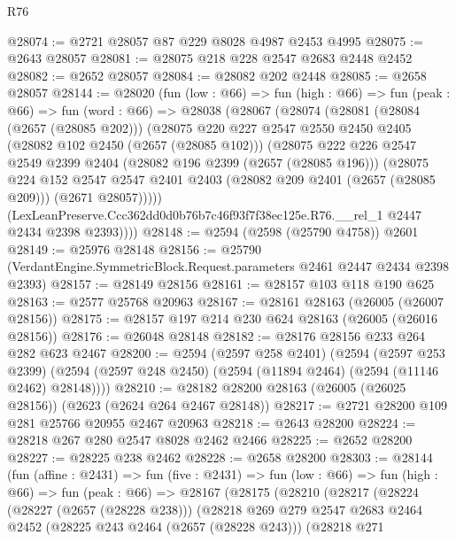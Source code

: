 \begin{lexlean}{R76}
\begin{coremodule}
@28074 := @2721 @28057 @87 @229 @8028 @4987 @2453 @4995
@28075 := @2643 @28057
@28081 := @28075 @218 @228 @2547 @2683 @2448 @2452
@28082 := @2652 @28057
@28084 := @28082 @202 @2448
@28085 := @2658 @28057
@28144 := @28020
    (fun (low : @66) =>
    fun (high : @66) =>
    fun (peak : @66) =>
    fun (word : @66) =>
    @28038
      (@28067
        (@28074
          (@28081
            (@28084 (@2657 (@28085 @202)))
            (@28075
              @220
              @227
              @2547
              @2550
              @2450
              @2405
              (@28082 @102 @2450 (@2657 (@28085 @102)))
              (@28075
                @222
                @226
                @2547
                @2549
                @2399
                @2404
                (@28082 @196 @2399 (@2657 (@28085 @196)))
                (@28075
                  @224
                  @152
                  @2547
                  @2547
                  @2401
                  @2403
                  (@28082 @209 @2401 (@2657 (@28085 @209)))
                  (@2671 @28057)))))
          (LexLeanPreserve.Ccc362dd0d0b76b7c46f93f7f38ec125e.R76.__rel_1 @2447 @2434 @2398 @2393))))
@28148 := @2594 (@2598 (@25790 @4758)) @2601
@28149 := @25976 @28148
@28156 := @25790 (VerdantEngine.SymmetricBlock.Request.parameters @2461 @2447 @2434 @2398 @2393)
@28157 := @28149 @28156
@28161 := @28157 @103 @118 @190 @625
@28163 := @2577 @25768 @20963
@28167 := @28161 @28163 (@26005 (@26007 @28156))
@28175 := @28157 @197 @214 @230 @624 @28163 (@26005 (@26016 @28156))
@28176 := @26048 @28148
@28182 := @28176 @28156 @233 @264 @282 @623 @2467
@28200 := @2594
    (@2597 @258 @2401)
    (@2594
      (@2597 @253 @2399)
      (@2594 (@2597 @248 @2450) (@2594 (@11894 @2464) (@2594 (@11146 @2462) @28148))))
@28210 := @28182 @28200 @28163 (@26005 (@26025 @28156)) (@2623 (@2624 @264 @2467 @28148))
@28217 := @2721 @28200 @109 @281 @25766 @20955 @2467 @20963
@28218 := @2643 @28200
@28224 := @28218 @267 @280 @2547 @8028 @2462 @2466
@28225 := @2652 @28200
@28227 := @28225 @238 @2462
@28228 := @2658 @28200
@28303 := @28144
    (fun (affine : @2431) =>
    fun (five : @2431) =>
    fun (low : @66) =>
    fun (high : @66) =>
    fun (peak : @66) =>
    @28167
      (@28175
        (@28210
          (@28217
            (@28224
              (@28227 (@2657 (@28228 @238)))
              (@28218
                @269
                @279
                @2547
                @2683
                @2464
                @2452
                (@28225 @243 @2464 (@2657 (@28228 @243)))
                (@28218
                  @271

\end{coremodule}
\end{lexlean}
